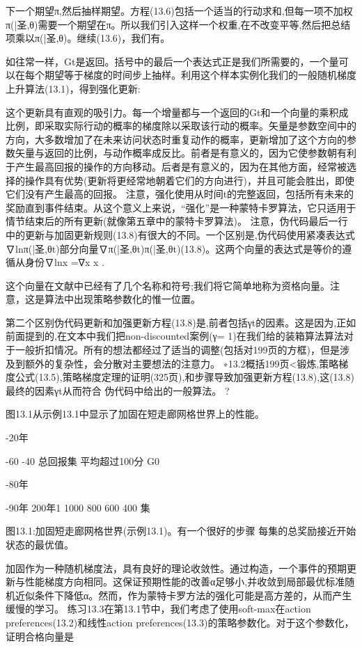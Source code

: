 下一个期望π,然后抽样期望。方程(13.6)包括一个适当的行动求和,但每一项不加权π(|圣,θ)需要一个期望在π。所以我们引入这样一个权重,在不改变平等,然后把总结项乘以π(|圣,θ)。继续(13.6)，我们有。
 

如往常一样，Gt是返回。括号中的最后一个表达式正是我们所需要的，一个量可以在每个期望等于梯度的时间步上抽样。利用这个样本实例化我们的一般随机梯度上升算法(13.1)，得到强化更新:
 

这个更新具有直观的吸引力。每一个增量都与一个返回的Gt和一个向量的乘积成比例，即采取实际行动的概率的梯度除以采取该行动的概率。矢量是参数空间中的方向，大多数增加了在未来访问状态时重复动作的概率，更新增加了这个方向的参数矢量与返回的比例，与动作概率成反比。前者是有意义的，因为它使参数朝有利于产生最高回报的操作的方向移动。后者是有意义的，因为在其他方面，经常被选择的操作具有优势(更新将更经常地朝着它们的方向进行)，并且可能会胜出，即使它们没有产生最高的回报。
注意，强化使用从时间t的完整返回，包括所有未来的奖励直到事件结束。从这个意义上来说，“强化”是一种蒙特卡罗算法，它只适用于情节结束后的所有更新(就像第五章中的蒙特卡罗算法)。
注意，伪代码最后一行中的更新与加固更新规则(13.8)有很大的不同。一个区别是,伪代码使用紧凑表达式∇lnπ(|圣,θt)部分向量∇π(|圣,θt)π(|圣,θt)(13.8)。这两个向量的表达式是等价的遵循从身份∇lnx =∇x
x
.

这个向量在文献中已经有了几个名称和符号;我们将它简单地称为资格向量。注意，这是算法中出现策略参数化的惟一位置。

第二个区别伪代码更新和加强更新方程(13.8)是,前者包括γt的因素。这是因为,正如前面提到的,在文本中我们把non-discounted案例(γ= 1)在我们给的装箱算法算法对于一般折扣情况。所有的想法都经过了适当的调整(包括对199页的方框)，但是涉及到额外的复杂性，会分散对主要想法的注意力。
∗13.2概括199页<锻炼,策略梯度公式(13.5),策略梯度定理的证明(325页),和步骤导致加强更新方程(13.8),这(13.8)最终的因素γt从而符合
伪代码中给出的一般算法。 					?

图13.1从示例13.1中显示了加固在短走廊网格世界上的性能。
 
-20年

-60 -40
总回报集
平均超过100分
G0

-80年

-90年
200年1
1000 800 600 400
集

图13.1:加固短走廊网格世界(示例13.1)。有一个很好的步骤
每集的总奖励接近开始状态的最优值。

加固作为一种随机梯度法，具有良好的理论收敛性。通过构造，一个事件的预期更新与性能梯度方向相同。这保证预期性能的改善α足够小,并收敛到局部最优标准随机近似条件下降低α。然而，作为蒙特卡罗方法的强化可能是高方差的，从而产生缓慢的学习。
练习13.3在第13.1节中，我们考虑了使用soft-max在action preferences(13.2)和线性action preferences(13.3)的策略参数化。对于这个参数化，证明合格向量是

